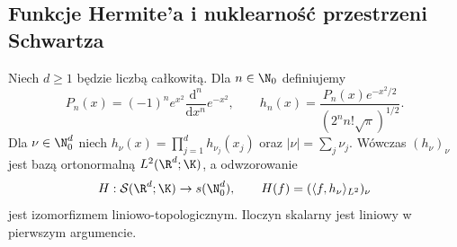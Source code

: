 \subsection{Funkcje Hermite'a i nuklearność przestrzeni Schwartza}
\label{sec:hermite-supp23}

\begin{lemat}
\label{lem:hermite-schwartz23}
Niech $d\ge1$ będzie liczbą całkowitą. Dla $n\in\N_0$ definiujemy
\[
 P_n(x)=(-1)^n e^{x^2}\frac{\mathrm d^n}{\mathrm dx^n}e^{-x^2},
 \qquad h_n(x)=\frac{P_n(x)e^{-x^2/2}}{(2^n n!\sqrt\pi)^{1/2}}.
\]
Dla $\nu\in\N_0^d$ niech $h_\nu(x)=\prod_{j=1}^d h_{\nu_j}(x_j)$
oraz $|\nu|=\sum_j\nu_j$. Wówczas $(h_\nu)_\nu$
jest bazą ortonormalną $L^2(\R^d;\K)$, a odwzorowanie
\[
 H:\mathcal S(\R^d;\K)\to s(\N_0^d),\qquad
 H(f)=(\langle f,h_\nu\rangle_{L^2})_\nu
\]
jest izomorfizmem liniowo-topologicznym. Iloczyn skalarny
jest liniowy w pierwszym argumencie.
\end{lemat}
